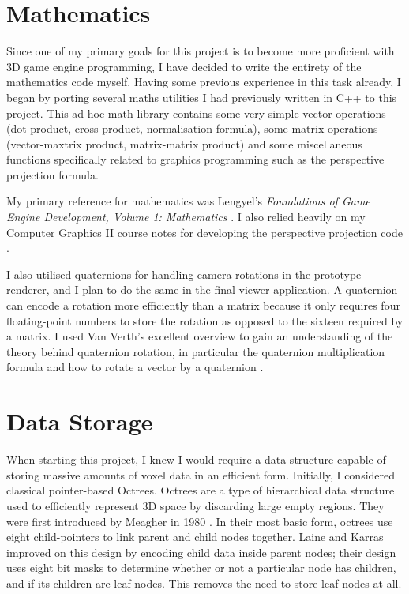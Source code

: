 \section{Mathematics}
Since one of my primary goals for this project is to become more proficient with 3D game engine programming, I have decided to write the entirety of the mathematics code myself. Having some previous experience in this task already, I began by porting several maths utilities I had previously written in C++ to this project. This ad-hoc math library contains some very simple vector operations (dot product, cross product, normalisation formula), some matrix operations (vector-maxtrix product, matrix-matrix product) and some miscellaneous functions specifically related to graphics programming such as the perspective projection formula.

My primary reference for mathematics was Lengyel's \textit{Foundations of Game Engine Development, Volume 1: Mathematics} \autocite{lengyel2016math}. I also relied heavily on my Computer Graphics II course notes for developing the perspective projection code \autocite{healy2019perspective}.

I also utilised quaternions for handling camera rotations in the prototype renderer, and I plan to do the same in the final viewer application. A quaternion can encode a rotation more efficiently than a matrix because it only requires four floating-point numbers to store the rotation as opposed to the sixteen required by a matrix. I used Van Verth's excellent overview to gain an understanding of the theory behind quaternion rotation, in particular the quaternion multiplication formula and how to rotate a vector by a quaternion \autocite{van2013understanding}.

\section{Data Storage}
When starting this project, I knew I would require a data structure capable of storing massive amounts of voxel data in an efficient form. Initially, I considered classical pointer-based Octrees. Octrees are a type of hierarchical data structure used to efficiently represent 3D space by discarding large empty regions. They were first introduced by Meagher in 1980 \autocite{meagher1980octree}. In their most basic form, octrees use eight child-pointers to link parent and child nodes together. Laine and Karras improved on this design by encoding child data inside parent nodes; their design uses eight bit masks to determine whether or not a particular node has children, and if its children are leaf nodes. This removes the need to store leaf nodes at all.

